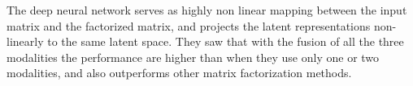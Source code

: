The deep neural network serves as highly non linear mapping between the input matrix and the factorized matrix, and projects the latent representations non-linearly to the same latent space. 
They saw that with the fusion of all the three modalities the performance are higher than when they use only one or two modalities, and also outperforms other matrix factorization methods.